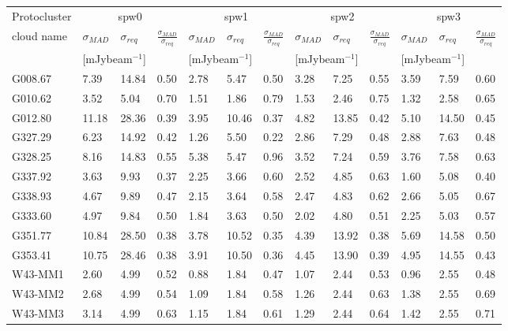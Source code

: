 \documentclass[longauth]{aa} %
\newcommand{\tdust}{\mbox{$T_{\rm dust}$}}
\newcommand{\lbol}{\ensuremath{L_{\mathrm{bol}}\xspace}}        %
\begin{document}
\begin{appendix}
\begin{table}[htbp!]
\begin{tabular}{@{\extracolsep{4pt}}lllllllllllll@{}}
\hline \noalign {\smallskip}
Protocluster  & \multicolumn{3}{c}{spw0}  & \multicolumn{3}{c}{spw1}  & \multicolumn{3}{c}{spw2}
    & \multicolumn{3}{c}{spw3}  \\ %
\cline{2-4}\cline{5-7}\cline{8-10}\cline{11-13}
cloud name\tnote{1}  & $\sigma_{MAD}$ & $\sigma_{req}$ & $\frac{\sigma_{MAD}}{\sigma_{req}}$  & $\sigma_{MAD}$ & $\sigma_{req}$ & $\frac{\sigma_{MAD}}{\sigma_{req}}$  & $\sigma_{MAD}$ & $\sigma_{req}$ & $\frac{\sigma_{MAD}}{\sigma_{req}}$  & $\sigma_{MAD}$ & $\sigma_{req}$ & $\frac{\sigma_{MAD}}{\sigma_{req}}$\\
& \multicolumn{2}{c}{[mJybeam$^{-1}$]}& & \multicolumn{2}{c}{[mJybeam$^{-1}$]}& &  \multicolumn{2}{c}{[mJybeam$^{-1}$]}& & \multicolumn{2}{c}{[mJybeam$^{-1}$]}\\
\hline \noalign {\smallskip}
G008.67  &  7.39 & 14.84 & 0.50 & 2.78 & 5.47 & 0.50 & 3.28 & 7.25 & 0.55 & 3.59 & 7.59 & 0.60 \\
G010.62  &  3.52 & 5.04 & 0.70 & 1.51 & 1.86 & 0.79 & 1.53 & 2.46 & 0.75 & 1.32 & 2.58 & 0.65 \\
G012.80  &  11.18 & 28.36 & 0.39 & 3.95 & 10.46 & 0.37 & 4.82 & 13.85 & 0.42 & 5.10 & 14.50 & 0.45 \\
G327.29  &  6.23 & 14.92 & 0.42 & 1.26 & 5.50 & 0.22 & 2.86 & 7.29 & 0.48 & 2.88 & 7.63 & 0.48 \\
G328.25  &  8.16 & 14.83 & 0.55 & 5.38 & 5.47 & 0.96 & 3.52 & 7.24 & 0.59 & 3.76 & 7.58 & 0.63 \\
G337.92  &  3.63 & 9.93 & 0.37 & 2.25 & 3.66 & 0.60 & 2.52 & 4.85 & 0.63 & 1.60 & 5.08 & 0.40 \\
G338.93  &  4.67 & 9.89 & 0.47 & 2.15 & 3.64 & 0.58 & 2.47 & 4.83 & 0.62 & 2.66 & 5.05 & 0.67 \\
G333.60  &  4.97 & 9.84 & 0.50 & 1.84 & 3.63 & 0.50 & 2.02 & 4.80 & 0.51 & 2.25 & 5.03 & 0.57 \\
G351.77  &  10.84 & 28.50 & 0.38 & 3.78 & 10.52 & 0.35 & 4.39 & 13.92 & 0.38 & 5.69 & 14.58 & 0.50 \\
G353.41  &  10.75 & 28.46 & 0.38 & 3.91 & 10.50 & 0.36 & 4.45 & 13.90 & 0.39 & 4.95 & 14.55 & 0.43 \\
W43-MM1  &  2.60 & 4.99 & 0.52 & 0.88 & 1.84 & 0.47 & 1.07 & 2.44 & 0.53 & 0.96 & 2.55 & 0.48 \\
W43-MM2  &  2.68 & 4.99 & 0.54 & 1.09 & 1.84 & 0.58 & 1.26 & 2.44 & 0.63 & 1.38 & 2.55 & 0.69 \\
W43-MM3  &  3.14 & 4.99 & 0.63 & 1.15 & 1.84 & 0.61 & 1.29 & 2.44 & 0.64 & 1.42 & 2.55 & 0.71 \\

\end{tabular}
\end{table}
\end{appendix}
\end{document}

